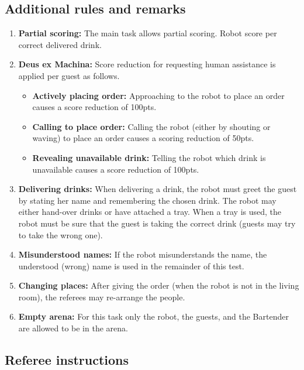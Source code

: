 \subsection{Additional rules and remarks}
\begin{enumerate}
	\item \textbf{Partial scoring:} The main task allows partial scoring.
	Robot score per correct delivered drink.

	\item \textbf{Deus ex Machina:} Score reduction for requesting human assistance is applied per guest as follows.
	\begin{itemize}[nosep]
		\item \textbf{Actively placing order:} Approaching to the robot to place an order causes a score reduction of 100pts.

		\item \textbf{Calling to place order:} Calling the robot (either by shouting or waving) to place an order causes a scoring reduction of 50pts.

		\item \textbf{Revealing unavailable drink:} Telling the robot which drink is unavailable causes a score reduction of 100pts.
	\end{itemize}

	\item \textbf{Delivering drinks:} When delivering a drink, the robot must greet the guest by stating her name and remembering the chosen drink.
	The robot may either hand-over drinks or have attached a tray.
	When a tray is used, the robot must be sure that the guest is taking the correct drink (guests may try to take the wrong one).

	\item \textbf{Misunderstood names:} If the robot misunderstands the name, the understood (wrong) name is used in the remainder of this test.

	\item \textbf{Changing places:} After giving the order (when the robot is not in the living room), the referees may re-arrange the people.

	\item \textbf{Empty arena:} For this task only the robot, the guests, and the Bartender are allowed to be in the arena.
\end{enumerate}

\subsection{Referee instructions}

